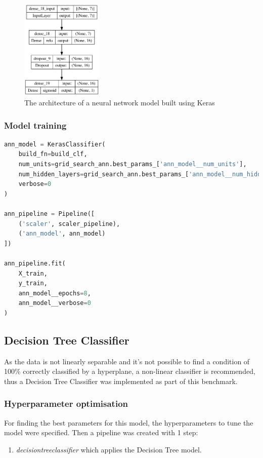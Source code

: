 \documentclass{article}
\begin{document}
\begin{figure}
\centering
\includegraphics[width=0.35\textwidth]{nn_plot.png}
\caption{\label{fig:nn_plot}The architecture of a neural network model built using Keras}
\end{figure}

\subsubsection{Model training}



\begin{lstlisting}[language=Python]
ann_model = KerasClassifier(
    build_fn=build_clf,
    num_units=grid_search_ann.best_params_['ann_model__num_units'],
    num_hidden_layers=grid_search_ann.best_params_['ann_model__num_hidden_layers'],
    verbose=0
)

ann_pipeline = Pipeline([
    ('scaler', scaler_pipeline), 
    ('ann_model', ann_model)
])

ann_pipeline.fit(
    X_train, 
    y_train,     
    ann_model__epochs=8, 
    ann_model__verbose=0
)
\end{lstlisting}





\subsection{Decision Tree Classifier}
As the data is not linearly separable and it's not possible to find a condition of 100\% correctly classified by a hyperplane, a non-linear classifier is recommended, thus a Decision Tree Classifier was implemented as part of this benchmark.

\subsubsection{Hyperparameter optimisation}
For finding the best parameters for this model, the hyperparameters to tune the model were specified. Then a pipeline was created with 1 step:
\begin{enumerate}
\item \emph{decisiontreeclassifier} which applies the Decision Tree model.
\end{enumerate}
\end{document}
